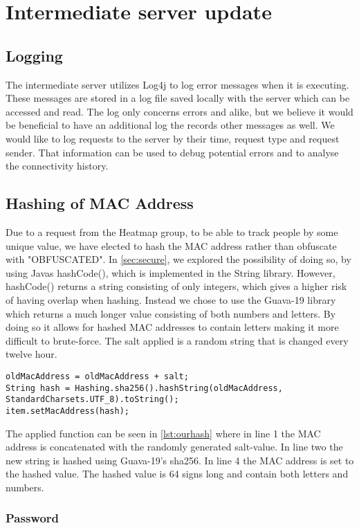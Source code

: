 \section{Intermediate server update}

\subsection*{Logging}
The intermediate server utilizes Log4j\cite{log4j} to log error messages when it is executing. These messages are stored in a log file saved locally with the server which can be accessed and read. The log only concerns errors and alike, but we believe it would be beneficial to have an additional log the records other messages as well. We would like to log requests to the server by their time, request type and request sender. That information can be used to debug potential errors and to analyse the connectivity history. 

\subsection*{Hashing of MAC Address}
Due to a request from the Heatmap group, to be able to track people by some unique value, we have elected to hash the MAC address rather than obfuscate with "OBFUSCATED". In \cref{sec:secure}, we explored the possibility of doing so, by using Javas hashCode(), which is implemented in the String library. However, hashCode() returns a string consisting of only integers, which gives a higher risk of having overlap when hashing. Instead we chose to use the Guava-19 library which returns a much longer value consisting of both numbers and letters. By doing so it allows for hashed MAC addresses to contain letters making it more difficult to brute-force. The salt applied is a random string that is changed every twelve hour. 

\begin{lstlisting}[caption={Hashing a MAC address},label={lst:ourhash},language=inc_Java]
oldMacAddress = oldMacAddress + salt;
String hash = Hashing.sha256().hashString(oldMacAddress, 
StandardCharsets.UTF_8).toString();
item.setMacAddress(hash);
\end{lstlisting}

The applied function can be seen in \cref{lst:ourhash} where in line 1 the MAC address is concatenated with the randomly generated salt-value. In line two the new string is hashed using Guava-19's sha256. In line 4 the MAC address is set to the hashed value. The hashed value is 64 signs long and contain both letters and numbers.




\subsubsection*{Password}

